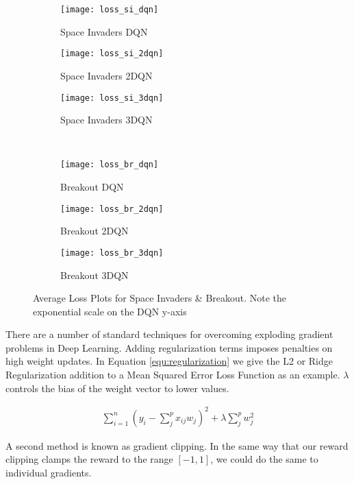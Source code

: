 \begin{figure}[h]
	\centering
	\begin{subfigure}{.3\textwidth}
		\centering
		\texttt{[image: loss\_si\_dqn]}
		\caption{Space Invaders DQN}
		\label{subfig:loss_si_dqn}
	\end{subfigure}%
	\begin{subfigure}{.3\textwidth}
		\centering
		\texttt{[image: loss\_si\_2dqn]}
		\caption{Space Invaders 2DQN}
		\label{subfig:loss_si_2dqn}
	\end{subfigure}%
	\begin{subfigure}{.3\textwidth}
		\centering
		\texttt{[image: loss\_si\_3dqn]}
		\caption{Space Invaders 3DQN}
		\label{subfig:loss_si_3dqn}
	\end{subfigure}%
	\\
	\begin{subfigure}{.3\textwidth}
		\centering
		\texttt{[image: loss\_br\_dqn]}
		\caption{Breakout DQN}
		\label{subfig:loss_br_dqn}
	\end{subfigure}%
	\begin{subfigure}{.3\textwidth}
		\centering
		\texttt{[image: loss\_br\_2dqn]}
		\caption{Breakout 2DQN}
		\label{subfig:loss_br_2dqn}
	\end{subfigure}%
	\begin{subfigure}{.3\textwidth}
		\centering
		\texttt{[image: loss\_br\_3dqn]}
		\caption{Breakout 3DQN}
		\label{subfig:loss_br_3dqn}
	\end{subfigure}
	\caption{Average Loss Plots for Space Invaders \& Breakout. Note the exponential scale on the DQN y-axis}
	\label{fig:loss_plots}
\end{figure}

There are a number of standard techniques for overcoming exploding gradient problems in Deep Learning. Adding regularization terms imposes penalties on high weight updates. In Equation \ref{equ:regularization} we give the L2 or Ridge Regularization addition to a Mean Squared Error Loss Function as an example. $\lambda$ controls the  bias of the weight vector to lower values.

\begin{align}
	\label{equ:regularization}
	\sum^{n}_{i=1}(y_{i} - \sum^{p}_{j}x_{ij}w_{j})^{2} + \lambda \sum^{p}_jw^{2}_{j}
\end{align}

A second method is known as gradient clipping. In the same way that our reward clipping clamps the reward to the range $[-1, 1]$, we could do the same to individual gradients. \paragraph{}

